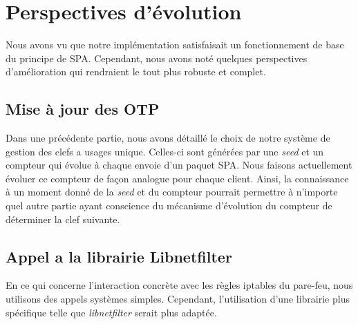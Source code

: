 \chapter{Perspectives d'évolution}

Nous avons vu que notre implémentation satisfaisait un fonctionnement de base du principe de SPA.
Cependant, nous avons noté quelques perspectives d'amélioration qui rendraient le tout plus robuste et complet.

\section{Mise à jour des OTP}
Dans une précédente partie, nous avons détaillé le choix de notre système de gestion des clefs a usages unique. 
Celles-ci sont générées par une \emph{seed} et un compteur qui évolue à chaque envoie d'un paquet SPA.
Nous faisons actuellement évoluer ce compteur de façon analogue pour chaque client.
Ainsi, la connaissance à un moment donné de la \emph{seed} et du compteur pourrait permettre à n'importe quel autre partie ayant conscience du mécanisme d'évolution du compteur de déterminer la clef suivante.

\section{Appel a la librairie Libnetfilter}
En ce qui concerne l'interaction concrète avec les règles iptables du pare-feu, nous utilisons des appels systèmes simples. Cependant, l'utilisation d'une librairie plus spécifique telle que \emph{libnetfilter} serait plus adaptée.
